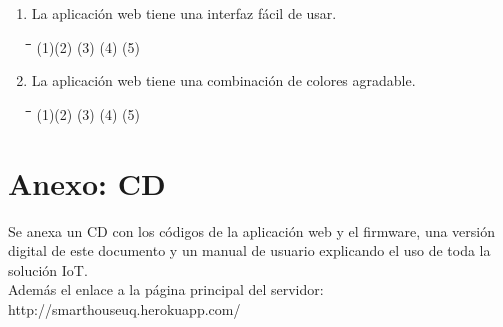 \begin{appendix}
\begin{enumerate}
	\item La aplicación web tiene una interfaz fácil de usar.

\begin{tabbing}
	\hspace{2cm}\=\hspace{2cm}\=\hspace{2cm}\=\hspace{2cm}\=\kill
	(1)\>(2)  \>(3)  \>(4)  \>(5) 
\end{tabbing} 

	\item La aplicación web tiene una combinación de colores agradable.

\begin{tabbing}
	\hspace{2cm}\=\hspace{2cm}\=\hspace{2cm}\=\hspace{2cm}\=\kill
	(1)\>(2)  \>(3)  \>(4)  \>(5) 
\end{tabbing} 

\end{enumerate}

\chapter{Anexo: CD}

Se anexa un CD con los códigos de la aplicación web y el firmware, una versión digital de este documento y un manual de usuario explicando el uso de toda la solución IoT.\\

Además el enlace a la página principal del servidor: http://smarthouseuq.herokuapp.com/

\end{appendix}
